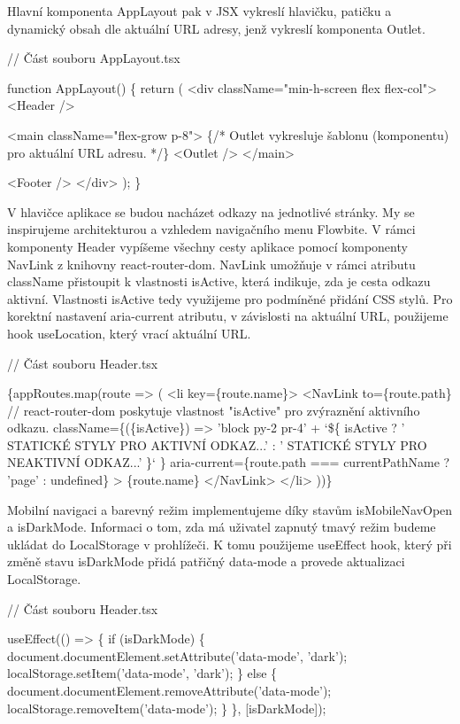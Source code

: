 Hlavní komponenta AppLayout pak v JSX vykreslí hlavičku, patičku a dynamický obsah dle aktuální URL adresy, jenž vykreslí komponenta Outlet.

\begin{prog}
// Část souboru AppLayout.tsx

function AppLayout() \{
  return (
    <div className="min-h-screen flex flex-col">
      <Header />

      <main className="flex-grow p-8">
        \{/* Outlet vykresluje šablonu (komponentu) pro aktuální URL adresu. */\}
        <Outlet />
      </main>

      <Footer />
    </div>
  );
\}
\end{prog}

V hlavičce aplikace se budou nacházet odkazy na jednotlivé stránky. My se inspirujeme architekturou a vzhledem navigačního menu Flowbite. 
V rámci komponenty Header vypíšeme všechny cesty aplikace pomocí komponenty NavLink z knihovny react-router-dom. NavLink umožňuje v rámci atributu className přistoupit k vlastnosti isActive, která indikuje, zda je cesta odkazu aktivní. 
Vlastnosti isActive tedy využijeme pro podmíněné přidání CSS stylů. Pro korektní nastavení aria-current atributu, v závislosti na aktuální URL, použijeme hook useLocation, který vrací aktuální URL.

\begin{prog}
// Část souboru Header.tsx

\{appRoutes.map(route => (
  <li key=\{route.name\}>
    <NavLink
      to=\{route.path\}
      // react-router-dom poskytuje vlastnost "isActive"
        pro zvýraznění aktivního odkazu.
      className=\{(\{isActive\}) =>
        'block py-2 pr-4' +
        `\$\{
          isActive
            ? ' STATICKÉ STYLY PRO AKTIVNÍ ODKAZ...'
            : ' STATICKÉ STYLY PRO NEAKTIVNÍ ODKAZ...'
        \}`
      \}
      aria-current=\{route.path === currentPathName ? 'page' : undefined\}
    >
      \{route.name\}
    </NavLink>
  </li>
))\}
\end{prog}

Mobilní navigaci a barevný režim implementujeme díky stavům isMobileNavOpen a isDarkMode. Informaci o tom, zda má uživatel zapnutý tmavý režim budeme ukládat do LocalStorage v prohlížeči. 
K tomu použijeme useEffect hook, který při změně stavu isDarkMode přidá patřičný data-mode a provede aktualizaci LocalStorage.

\begin{prog}
// Část souboru Header.tsx

useEffect(() => \{
  if (isDarkMode) \{
    document.documentElement.setAttribute('data-mode', 'dark');
    localStorage.setItem('data-mode', 'dark');
  \} else \{
    document.documentElement.removeAttribute('data-mode');
    localStorage.removeItem('data-mode');
  \}
\}, [isDarkMode]);
\end{prog}